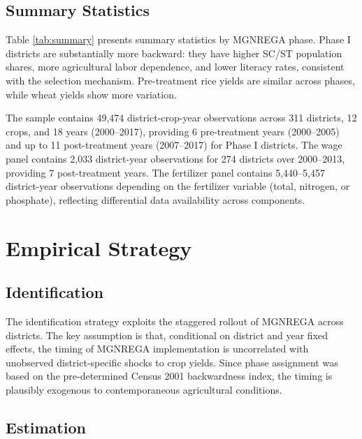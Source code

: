 \documentclass[12pt]{article}
\begin{document}
\subsection{Summary Statistics}



Table \ref{tab:summary} presents summary statistics by MGNREGA phase. Phase I districts are substantially more backward: they have higher SC/ST population shares, more agricultural labor dependence, and lower literacy rates, consistent with the selection mechanism. Pre-treatment rice yields are similar across phases, while wheat yields show more variation.

The sample contains 49,474 district-crop-year observations across 311 districts, 12 crops, and 18 years (2000--2017), providing 6 pre-treatment years (2000--2005) and up to 11 post-treatment years (2007--2017) for Phase I districts. The wage panel contains 2,033 district-year observations for 274 districts over 2000--2013, providing 7 post-treatment years. The fertilizer panel contains 5,440--5,457 district-year observations depending on the fertilizer variable (total, nitrogen, or phosphate), reflecting differential data availability across components.

\section{Empirical Strategy}

\subsection{Identification}

The identification strategy exploits the staggered rollout of MGNREGA across districts. The key assumption is that, conditional on district and year fixed effects, the timing of MGNREGA implementation is uncorrelated with unobserved district-specific shocks to crop yields. Since phase assignment was based on the pre-determined Census 2001 backwardness index, the timing is plausibly exogenous to contemporaneous agricultural conditions.

\subsection{Estimation}
\end{document}
